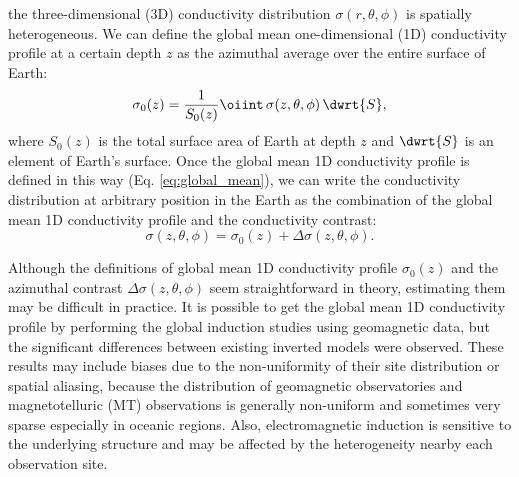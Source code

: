 	 the three-dimensional (3D) conductivity distribution $\sigma(r,\theta,\phi)$ is spatially heterogeneous. We can define the global mean one-dimensional (1D) conductivity profile at a certain depth $z$ as the azimuthal average over the entire surface of Earth:
	\begin{equation}\label{eq:global_mean}
		\sigma_0(z) = \frac{1}{S_0(z)} \oiint\, \sigma(z,\theta,\phi)\, \dwrt{S},
	\end{equation}
	where $S_0(z)$ is the total surface area of Earth at depth $z$ and $\dwrt{S}$ is an element of Earth's surface. Once the global mean 1D conductivity profile is defined in this way (Eq. \ref{eq:global_mean}), we can write the conductivity distribution at arbitrary position in the Earth as the combination of the global mean 1D conductivity profile and the conductivity contrast:
	\begin{equation}\label{eq:global_model}
		\sigma(z,\theta,\phi) = \sigma_0(z) + \Delta\sigma(z,\theta,\phi).
	\end{equation}
	
	Although the definitions of global mean 1D conductivity profile $\sigma_0(z)$ and the azimuthal contrast $\Delta\sigma(z,\theta,\phi)$ seem straightforward in theory, estimating them may be difficult in practice. It is possible to get the global mean 1D conductivity profile by performing the global induction studies using geomagnetic data, but the significant differences between existing inverted models \citep[e.g.,][]{kelbert2009a, kuvshinov2012a, semenov2012a} were observed. 
	These results may include biases due to the non-uniformity of their site distribution or spatial aliasing, because the distribution of geomagnetic observatories and magnetotelluric (MT) observations is generally non-uniform and sometimes very sparse especially in oceanic regions. Also, electromagnetic induction is sensitive to the underlying structure and may be affected by the heterogeneity nearby each observation site. 
	
